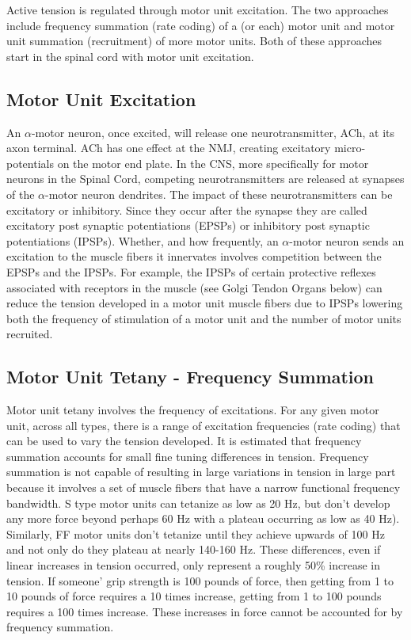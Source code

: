 Active tension is regulated through motor unit excitation. The two approaches include frequency summation (rate coding) of a (or each) motor unit and motor unit summation (recruitment) of more motor units. Both of these approaches start in the spinal cord with motor unit excitation.

\subsection{Motor Unit Excitation}

An $\alpha$-motor neuron, once excited, will release one neurotransmitter, ACh, at its axon terminal. ACh has one effect at the NMJ, creating excitatory micro-potentials on the motor end plate. In the CNS, more specifically for motor neurons in the Spinal Cord, competing neurotransmitters are released at synapses of the $\alpha$-motor neuron dendrites. The impact of these neurotransmitters can be excitatory or inhibitory. Since they occur after the synapse they are called excitatory post synaptic potentiations (EPSPs) or inhibitory post synaptic potentiations (IPSPs). Whether, and how frequently, an $\alpha$-motor neuron sends an excitation to the muscle fibers it innervates involves competition between the EPSPs and the IPSPs. For example, the IPSPs of certain protective reflexes associated with receptors in the muscle (see Golgi Tendon Organs below) can reduce the tension developed in a motor unit muscle fibers due to IPSPs lowering both the frequency of stimulation of a motor unit and the number of motor units recruited.

\subsection{Motor Unit Tetany - Frequency Summation}

Motor unit tetany involves the frequency of excitations. For any given motor unit, across all types, there is a range of excitation frequencies (rate coding) that can be used to vary the tension developed. It is estimated that frequency summation accounts for small fine tuning differences in tension. Frequency summation is not capable of resulting in large variations in tension in large part because it involves a set of muscle fibers that have a narrow functional frequency bandwidth. S type motor units can tetanize as low as 20 Hz, but don't develop any more force beyond perhaps 60 Hz with a plateau occurring as low as 40 Hz). Similarly, FF motor units don't tetanize until they achieve upwards of 100 Hz and not only do they plateau at nearly 140-160 Hz. These differences, even if linear increases in tension occurred, only represent a roughly 50\% increase in tension. If someone' grip strength is 100 pounds of force, then getting from 1 to 10 pounds of force requires a 10 times increase, getting from 1 to 100 pounds requires a 100 times increase. These increases in force cannot be accounted for by frequency summation.

